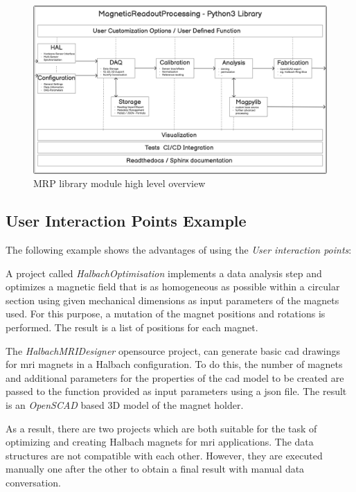 \begin{figure}
\centering
\includegraphics{./generated_images/border_MRP_library_module_high_level_overview.png}
\caption{MRP library module high level overview
\label{MRP_library_module_high_level_overview.png}}
\end{figure}

\hypertarget{user-interaction-points-example}{%
\subsection{User Interaction Points
Example}\label{user-interaction-points-example}}

The following example shows the advantages of using the \emph{User
interaction points}:

A project called \emph{HalbachOptimisation}
\cite{HalbachOptimisation} implements a data analysis step and
optimizes a magnetic field that is as homogeneous as possible within a
circular section using given mechanical dimensions as input parameters
of the magnets used. For this purpose, a mutation of the magnet
positions and rotations is performed. The result is a list of positions
for each magnet.

The \emph{HalbachMRIDesigner} \cite{HalbachMRIDesigner} opensource
project, can generate basic \gls{cad} drawings for \gls{mri} magnets in
a Halbach configuration. To do this, the number of magnets and
additional parameters for the properties of the \gls{cad} model to be
created are passed to the function provided as input parameters using a
\gls{json} file. The result is an \emph{OpenSCAD} \cite{OpenSCAD}
based 3D model of the magnet holder.

As a result, there are two projects which are both suitable for the task
of optimizing and creating Halbach magnets for \gls{mri} applications.
The data structures are not compatible with each other. However, they
are executed manually one after the other to obtain a final result with
manual data conversation.

